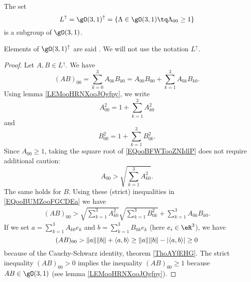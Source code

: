 \begin{lemma}       \label{LEMooEKXWooLEMBIj}
    The set
    \begin{equation}
        L^{\uparrow}=\gO(3,1)^{\uparrow}=\{ \Lambda\in\gO(3,1)\tq \Lambda_{00}\geq 1 \}
    \end{equation}
    is a subgroup of \( \gO(3,1)\).

    Elements of \( \gO(3,1)^{\uparrow}\) are said . We will not use the notation \( L^{\uparrow}\).
\end{lemma}

\begin{proof}
    Let \( A,B\in L^{\uparrow}\). We have
    \begin{equation}        \label{EQooBUMZooFGCDEa}
        (AB)_{00}=\sum_{k=0}^3A_{0k}B_{k0}=A_{00}B_{00}+\sum_{k=1}^3A_{0k}B_{k0}.
    \end{equation}
    Using lemma \ref{LEMooHRNXooJOgfpy}, we write
    \begin{equation}        \label{EQooBFWTooZNIdlP}
        A_{00}^2=1+\sum_{k=1}^3A_{k0}^2
    \end{equation}
    and
    \begin{equation}
        B_{00}^2=1+\sum_{k=1}^3B_{0k}^2.
    \end{equation}
    Since \( A_{00}\geq 1\), taking the square root of \eqref{EQooBFWTooZNIdlP} does not require additional caution:
    \begin{equation}
        A_{00}>\sqrt{ \sum_{k=1}^3A_{k0}^2 }.
    \end{equation}
    The same holds for \( B\). Using these (strict) inequalities in \eqref{EQooBUMZooFGCDEa} we have
    \begin{subequations}
        \begin{align}
            (AB)_{00}>\sqrt{ \sum_{k=1}^3A_{k0}^2 }\sqrt{ \sum_{k=1}^3B_{0k}^2 }+\sum_{k=1}^3A_{0k}B_{k0}.
        \end{align}
    \end{subequations}
    If we set \( a=\sum_{k=1}^3A_{k0}e_k\) and \( b=\sum_{k=1}^3B_{0k}e_k\) (here \( e_i\in \eR^3\)), we have
    \begin{equation}
        (AB)_{00}>\| a \|\| b \|+\langle a, b\rangle \\
        \geq \| a \|\| b \|-| \langle a, b\rangle  |\\
        \geq 0
    \end{equation}
    because of the Cauchy-Schwarz identity, theorem \ref{ThoAYfEHG}. The strict inequality \( (AB)_{00}>0\) implies the inequality \( (AB)_{00}\geq 1\) because \( AB\in \gO(3,1)\) (see lemma \ref{LEMooHRNXooJOgfpy}).
\end{proof}

